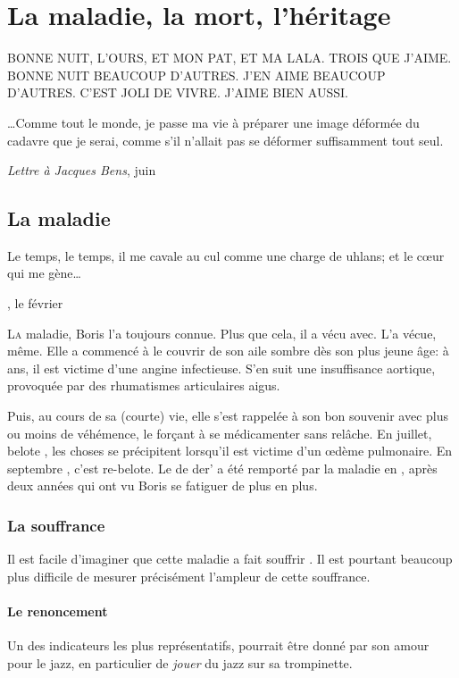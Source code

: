 \chapter{La maladie, la mort, l'héritage}
\epigraph{BONNE NUIT, L'OURS, ET MON PAT, ET MA LALA. TROIS QUE J'AIME. BONNE NUIT BEAUCOUP D'AUTRES. J'EN AIME BEAUCOUP D'AUTRES. C'EST JOLI DE VIVRE. J'AIME BIEN AUSSI.}
{\BV}
\epigraph{\ldots Comme tout le monde, je passe ma vie à préparer une image déformée du cadavre
que je serai, comme s'il n'allait pas se déformer suffisamment tout seul.}
{\emph{Lettre à Jacques Bens},  juin }
\vfill
\pagebreak
\section{La maladie}
\epigraph{Le temps, le temps, il me cavale au cul comme une charge de uhlans; et le c\oe{}ur qui me gène\ldots}
{\BV, le  février }

\lettrine{L}a maladie, Boris l'a toujours connue. Plus que cela, il a vécu avec. L'a vécue, même.
Elle a commencé à le couvrir de son aile sombre dès son plus jeune âge: à  ans, il
est victime d'une angine infectieuse. S'en suit une insuffisance aortique, provoquée 
par des rhumatismes articulaires aigus.

Puis, au cours de sa (courte) vie, elle s'est rappelée à son bon souvenir
avec plus ou moins de véhémence, le forçant à se médicamenter sans relâche. En juillet, belote ,
les choses se précipitent lorsqu'il est victime d'un \oe{}dème pulmonaire.
En septembre , c'est re-belote. Le  de der' a été remporté par la maladie
en , après deux années qui ont vu Boris se fatiguer de plus en plus.

\subsection{La souffrance}
Il est facile d'imaginer que cette maladie a fait souffrir \BV. Il est
pourtant beaucoup plus difficile de mesurer précisément l'ampleur de
cette souffrance.

\subsubsection{Le renoncement}
Un des indicateurs les plus représentatifs, pourrait être donné par son amour
pour le jazz, en particulier de \emph{jouer} du jazz sur sa trompinette.

